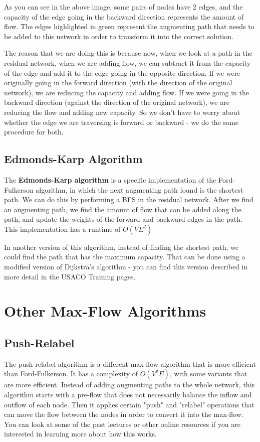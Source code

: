 \documentclass[12pt, letterpaper]{article}
\begin{document}
As you can see in the above image, some pairs of nodes have 2 edges, and the capacity of the edge going in the backward direction represents the amount of flow. The edges highlighted in green represent the augmenting path that needs to be added to this network in order to transform it into the correct solution.

The reason that we are doing this is because now, when we look at a path in the residual network, when we are adding flow, we can subtract it from the capacity of the edge and add it to the edge going in the opposite direction. If we were originally going in the forward direction (with the direction of the original network), we are reducing the capacity and adding flow. If we were going in the backward direction (against the direction of the original network), we are reducing the flow and adding new capacity. So we don't have to worry about whether the edge we are traversing is forward or backward - we do the same procedure for both.

\newpage
\subsection{Edmonds-Karp Algorithm}
The \textbf{Edmonds-Karp algorithm} is a specific implementation of the Ford-Fulkerson algorithm, in which the next augmenting path found is the shortest path. We can do this by performing a BFS in the residual network. After we find an augmenting path, we find the amount of flow that can be added along the path, and update the weights of the forward and backward edges in the path. This implementation has a runtime of $O(VE^2)$

In another version of this algorithm, instead of finding the shortest path, we could find the path that has the maximum capacity. That can be done using a modified version of Dijkstra's algorithm - you can find this version described in more detail in the USACO Training pages.

\section{Other Max-Flow Algorithms}
\subsection{Push-Relabel}
The push-relabel algorithm is a different max-flow algorithm that is more efficient than Ford-Fulkerson. It has a complexity of $O(V^2E)$, with some variants that are more efficient. Instead of adding augmenting paths to the whole network, this algorithm starts with a pre-flow that does not necessarily balance the inflow and outflow of each node. Then it applies certain "push" and "relabel" operations that can move the flow between the nodes in order to convert it into the max-flow. You can look at some of the past lectures or other online resources if you are interested in learning more about how this works.
\end{document}
